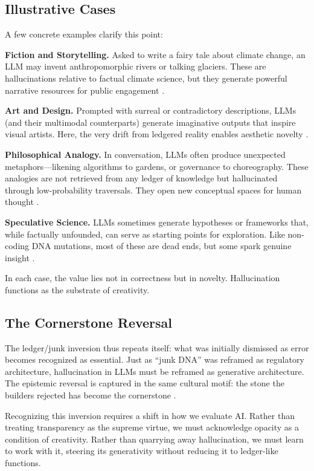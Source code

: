 \documentclass[12pt]{article}
\begin{document}
{{{\subsection{Illustrative Cases}
A few concrete examples clarify this point:

\textbf{Fiction and Storytelling.} Asked to write a fairy tale about climate change, an LLM may invent anthropomorphic rivers or talking glaciers. These are hallucinations relative to factual climate science, but they generate powerful narrative resources for public engagement \citep{bender2021}.

\textbf{Art and Design.} Prompted with surreal or contradictory descriptions, LLMs (and their multimodal counterparts) generate imaginative outputs that inspire visual artists. Here, the very drift from ledgered reality enables aesthetic novelty \citep{manovich2020}.

\textbf{Philosophical Analogy.} In conversation, LLMs often produce unexpected metaphors---likening algorithms to gardens, or governance to choreography. These analogies are not retrieved from any ledger of knowledge but hallucinated through low-probability traversals. They open new conceptual spaces for human thought \citep{hofstadter1995}.

\textbf{Speculative Science.} LLMs sometimes generate hypotheses or frameworks that, while factually unfounded, can serve as starting points for exploration. Like non-coding DNA mutations, most of these are dead ends, but some spark genuine insight \citep{rheinberger1997}.

In each case, the value lies not in correctness but in novelty. Hallucination functions as the substrate of creativity.

\subsection{The Cornerstone Reversal}
The ledger/junk inversion thus repeats itself: what was initially dismissed as error becomes recognized as essential. Just as ``junk DNA'' was reframed as regulatory architecture, hallucination in LLMs must be reframed as generative architecture. The epistemic reversal is captured in the same cultural motif: the stone the builders rejected has become the cornerstone \citep{glissant1997}.

Recognizing this inversion requires a shift in how we evaluate AI. Rather than treating transparency as the supreme virtue, we must acknowledge opacity as a condition of creativity. Rather than quarrying away hallucination, we must learn to work with it, steering its generativity without reducing it to ledger-like functions.

}}}
\end{document}
